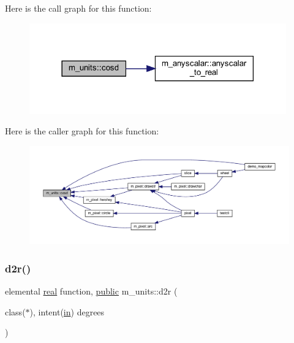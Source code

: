 Here is the call graph for this function\+:
\nopagebreak
\begin{figure}[H]
\begin{center}
\leavevmode
\includegraphics[width=314pt]{namespacem__units_ac02800d0ec7fcffc2fdb2a2216770678_cgraph}
\end{center}
\end{figure}
Here is the caller graph for this function\+:
\nopagebreak
\begin{figure}[H]
\begin{center}
\leavevmode
\includegraphics[width=350pt]{namespacem__units_ac02800d0ec7fcffc2fdb2a2216770678_icgraph}
\end{center}
\end{figure}
\mbox{\label{namespacem__units_a51fd676dee35aafbbd777cb88c347e23}} 
\subsubsection{\texorpdfstring{d2r()}{d2r()}}
{\footnotesize\ttfamily elemental \hyperlink{read__watch_83_8txt_abdb62bde002f38ef75f810d3a905a823}{real} function, \hyperlink{M__stopwatch_83_8txt_a2f74811300c361e53b430611a7d1769f}{public} m\+\_\+units\+::d2r (\begin{DoxyParamCaption}\item[{class($\ast$), intent(\hyperlink{M__journal_83_8txt_afce72651d1eed785a2132bee863b2f38}{in})}]{degrees }\end{DoxyParamCaption})}



